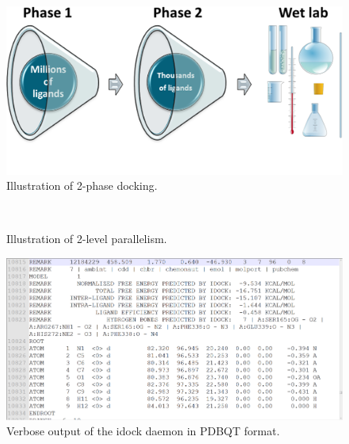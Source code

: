 \documentclass[12pt]{article}
\begin{document}
\begin{figure}
\begin{center}
\includegraphics[width=\linewidth,keepaspectratio=true]{2PhaseDocking.png}
\caption{\label{2PhaseDocking} Illustration of 2-phase docking.}
\end{center}
\end{figure}

\clearpage

\begin{center}
\begin{figure}
\centering
{}
\\
\caption{\label{2LevelParallelism} Illustration of 2-level parallelism.}
\end{figure}
\end{center}

\clearpage

\begin{figure}
\begin{center}
\includegraphics[width=\linewidth,keepaspectratio=true]{OutputPDBQT.png}
\caption{\label{OutputPDBQT} Verbose output of the idock daemon in PDBQT format.}
\end{center}
\end{figure}
\end{document}
